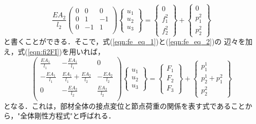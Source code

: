 \documentclass[10pt,a4j]{jarticle}
\begin{document}
\begin{equation}
	\frac{EA_2}{l_2}
	\left(
	\begin{array}{ccc}
		0 & 0  & 0 \\
		0 & 1 & -1 \\
		0 & -1 & 1  \\
	\end{array}
	\right)
	\left\{
	\begin{array}{c}
		u_1 \\
		u_2 \\
		u_3
	\end{array}
	\right\}
	=
	\left\{
	\begin{array}{c}
		0 \\
		f^2_1  \\
		f^2_2  
	\end{array}
	\right\}
	+
	\left\{
	\begin{array}{c}
		0 \\
		p^2_1 \\
		p^2_2
	\end{array}
	\right\}
	\label{eqn:fe_eq_2}
\end{equation}
と書くことができる．そこで，式(\ref{eqn:fe_eq_1})と(\ref{eqn:fe_eq_2})の
辺々を加え，式(\ref{eqn:fi2FI})を用いれば，
\begin{equation}
	\left(
	\begin{array}{ccc}
		\frac{EA_1}{l_1} & -\frac{EA_1}{l_1}  & 0 \\
		-\frac{EA_1}{l_1} & \frac{EA_1}{l_1}+\frac{EA_2}{l_2} & -\frac{EA_2}{l_2} \\
		0 & -\frac{EA_2}{l_2} & \frac{EA_2}{l_2}  \\
	\end{array}
	\right)
	\left\{
	\begin{array}{c}
		u_1 \\
		u_2 \\
		u_3
	\end{array}
	\right\}
	=
	\left\{
	\begin{array}{c}
		F_1 \\
		F_2  \\
		F_3  
	\end{array}
	\right\}
	+
	\left\{
	\begin{array}{c}
		p^1_1 \\
		p^1_2+p^2_1 \\
		p^2_2
	\end{array}
	\right\}
	\label{eqn:FE_eq}
\end{equation}
となる．これは，部材全体の接点変位と節点荷重の関係を表す式であることから，"全体剛性方程式"と呼ばれる．
\end{document}
